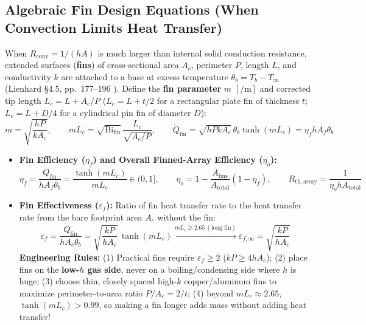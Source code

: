 \subsection{Algebraic Fin Design Equations (When Convection Limits Heat Transfer)}
When $R_{\mathrm{conv}} = 1/(hA)$ is much larger than internal solid conduction resistance, extended surfaces (\textbf{fins}) of cross-sectional area $A_c$, perimeter $P$, length $L$, and conductivity $k$ are attached to a base at excess temperature $\theta_b = T_b - T_\infty$ (Lienhard §4.5, pp.~177--196 ). Define the \textbf{fin parameter} $m$ $[\si{\per\meter}]$ and corrected tip length $L_c = L + A_c/P$ ($L_c = L + t/2$ for a rectangular plate fin of thickness $t$; $L_c = L + D/4$ for a cylindrical pin fin of diameter $D$):
\begin{equation}
  m = \sqrt{\frac{h P}{k A_c}}, \qquad m L_c = \sqrt{\mathrm{Bi}_{\mathrm{fin}}}\,\frac{L_c}{\sqrt{A_c/P}}, \qquad \dot{Q}_{\mathrm{fin}} = \sqrt{h P k A_c}\,\theta_b \tanh(m L_c) = \eta_f h A_f \theta_b
  \label{eq:10:fin-q}
\end{equation}
\begin{itemize}
  \item \textbf{Fin Efficiency ($\eta_f$) and Overall Finned-Array Efficiency ($\eta_o$):}
  \begin{equation}
    \eta_f = \frac{\dot{Q}_{\mathrm{fin}}}{h A_f \theta_b} = \frac{\tanh(m L_c)}{m L_c} \in (0, 1], \qquad \eta_o = 1 - \frac{A_{\mathrm{fins}}}{A_{\mathrm{total}}}\left(1 - \eta_f\right), \qquad R_{\mathrm{th,array}} = \frac{1}{\eta_o h A_{\mathrm{total}}}
    \label{eq:10:fin-eff}
  \end{equation}
  \item \textbf{Fin Effectiveness ($\varepsilon_f$):} Ratio of fin heat transfer rate to the heat transfer rate from the bare footprint area $A_c$ without the fin:
  \begin{equation}
    \varepsilon_f = \frac{\dot{Q}_{\mathrm{fin}}}{h A_c \theta_b} = \sqrt{\frac{k P}{h A_c}}\,\tanh(m L_c) \xrightarrow{m L_c \gtrsim 2.65\ (\text{long fin})} \varepsilon_{f,\infty} = \sqrt{\frac{k P}{h A_c}}
    \label{eq:10:fin-effectiveness}
  \end{equation}
  \textbf{Engineering Rules:} (1) Practical fins require $\varepsilon_f \ge 2$ ($k P \ge 4 h A_c$); (2) place fins on the \textbf{low-$h$ gas side}, never on a boiling/condensing side where $h$ is huge; (3) choose thin, closely spaced high-$k$ copper/aluminum fins to maximize perimeter-to-area ratio $P/A_c = 2/t$; (4) beyond $mL_c \approx 2.65$, $\tanh(mL_c) > 0.99$, so making a fin longer adds mass without adding heat transfer!
\end{itemize}


